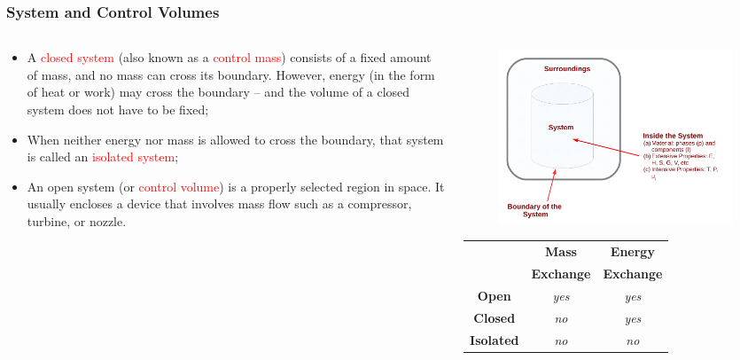 \documentclass[10pt,compress]{beamer}
\begin{document}
\scriptsize
\begin{frame}
 \frametitle{System and Control Volumes}
  \begin{columns}
    \begin{column}[l]{0.6\linewidth}
      \begin{itemize}%
       \item <1-> A \textcolor{red}{closed system} (also known as a \textcolor{red}{control mass}) consists of a fixed amount of mass, and no mass can cross its boundary. However, energy (in the form of heat or work) may cross the boundary -- and the volume of a closed system does not have to be fixed; 
       \item <2-> When neither energy nor mass is allowed to cross the boundary, that system is called an \textcolor{red}{isolated system};
       \item <3-> An open system (or \textcolor{red}{control volume}) is a properly selected region in space. It usually encloses a device that involves mass flow such as a compressor, turbine, or nozzle.
      \end{itemize}
    \end{column}
    \begin{column}[l]{0.4\linewidth}\scriptsize
      \begin{figure}%
        \begin{center}
          \includegraphics[width=\columnwidth,clip]{./Pics/Fig_SystemDefinition}
        \end{center}
      \end{figure}
      \begin{tabular}{|c|c|c|}
         \hline
                      & {\bf Mass} & {\bf Energy} \\
                      & {\bf Exchange} & {\bf Exchange} \\
         \hline
         {\bf Open}   & {\it yes}  & {\it yes}    \\
         {\bf Closed} & {\it no}   & {\it yes}    \\
         {\bf Isolated}&{\it no}   & {\it no}     \\
         \hline 
      \end{tabular}    
    \end{column}
  \end{columns}
\end{frame}
\end{document}
